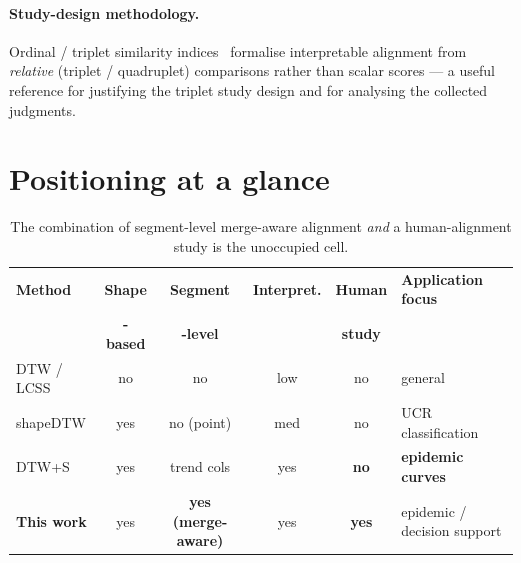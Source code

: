 \documentclass[11pt]{article}
\begin{document}
\paragraph{Study-design methodology.}
Ordinal / triplet similarity indices~\cite{ordinal2026} formalise interpretable alignment
from \emph{relative} (triplet / quadruplet) comparisons rather than scalar scores --- a
useful reference for justifying the triplet study design and for analysing the collected
judgments.

\section{Positioning at a glance}
\begin{table}[H]
\centering
\renewcommand{\arraystretch}{1.3}
\begin{tabularx}{\textwidth}{l c c c c X}
\toprule
\textbf{Method} & \textbf{Shape} & \textbf{Segment} & \textbf{Interpret.} & \textbf{Human} & \textbf{Application focus}\\
& \textbf{-based} & \textbf{-level} & & \textbf{study} & \\
\midrule
DTW / LCSS              & no  & no  & low  & no  & general\\
shapeDTW \cite{zhao2018}        & yes & no (point) & med & no  & UCR classification\\
DTW+S \cite{dtwpluss}           & yes & trend cols & yes & \textbf{no} & \textbf{epidemic curves}\\
\textbf{This work}     & yes & \textbf{yes (merge-aware)} & yes & \textbf{yes} & epidemic / decision support\\
\bottomrule
\end{tabularx}
\caption{The combination of segment-level merge-aware alignment \emph{and} a human-alignment
study is the unoccupied cell.}
\end{table}

\end{document}
